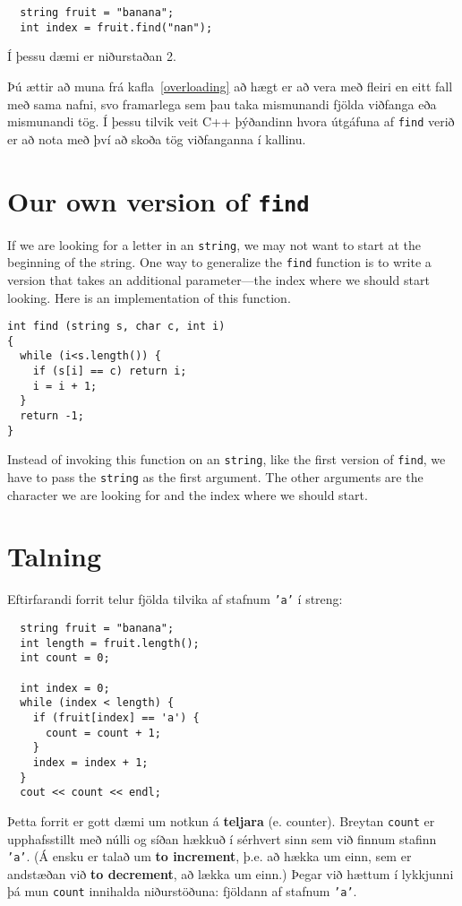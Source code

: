 \begin{verbatim}
  string fruit = "banana";
  int index = fruit.find("nan");
\end{verbatim}
%
Í þessu dæmi er niðurstaðan 2.

Þú ættir að muna frá kafla~\ref{overloading} að hægt er að vera með fleiri en eitt fall með sama nafni,
svo framarlega sem þau taka mismunandi fjölda viðfanga eða mismunandi tög.
Í þessu tilvik veit C++ þýðandinn hvora útgáfuna af {\tt find} verið er að nota með því að skoða tög viðfanganna í kallinu.

\section{Our own version of {\tt find}}

If we are looking for a letter in an {\tt string}, we may
not want to start at the beginning of the string.  One way
to generalize the {\tt find} function is to write a version
that takes an additional parameter---the index where we should
start looking.  Here is an implementation of this function.

\begin{verbatim}
int find (string s, char c, int i)
{
  while (i<s.length()) {
    if (s[i] == c) return i;
    i = i + 1;
  }
  return -1;
}
\end{verbatim}
%
Instead of invoking this function on an {\tt string}, like
the first version of {\tt find}, we have to pass the {\tt string}
as the first argument.  The other arguments are the character
we are looking for and the index where we should start.

\section{Talning}
\label{loopcount}

Eftirfarandi forrit telur fjölda tilvika af stafnum {\tt 'a'} í streng:

\begin{verbatim}
  string fruit = "banana";
  int length = fruit.length();
  int count = 0;

  int index = 0;
  while (index < length) {
    if (fruit[index] == 'a') {
      count = count + 1;
    }
    index = index + 1;
  }
  cout << count << endl;
\end{verbatim}
%
Þetta forrit er gott dæmi um notkun á {\bf teljara} (e. counter).
Breytan {\tt count} er upphafsstillt með núlli og síðan hækkuð í sérhvert sinn sem við finnum stafinn {\tt 'a'}.
(Á ensku er talað um {\bf to increment}, þ.e. að hækka um einn, sem er andstæðan við {\bf to decrement}, að lækka um einn.)
Þegar við hættum í lykkjunni þá mun {\tt count} innihalda niðurstöðuna: fjöldann af stafnum {\tt 'a'}.

